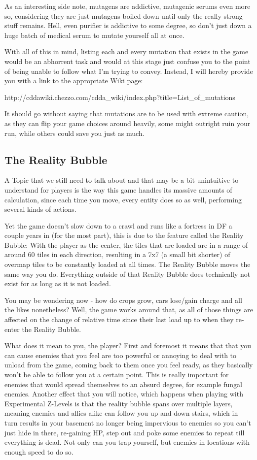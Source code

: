 As an interesting side note, mutagens are addictive, mutagenic serums even more so, considering they are just mutagens boiled down until only the really strong stuff remains. Hell, even purifier is addictive to some degree, so don't just down a huge batch of medical serum to mutate yourself all at once.

With all of this in mind, listing each and every mutation that exists in the game would be an abhorrent task and would at this stage just confuse you to the point of being unable to follow what I'm trying to convey. Instead, I will hereby provide you with a link to the appropriate Wiki page:

http://cddawiki.chezzo.com/cdda\_wiki/index.php?title=List\_of\_mutations

It should go without saying that mutations are to be used with extreme caution, as they can flip your game choices around heavily, some might outright ruin your run, while others could save you just as much.

\subsection{The Reality Bubble}

A Topic that we still need to talk about and that may be a bit unintuitive to understand for players is the way this game handles its massive amounts of calculation, since each time you move, every entity does so as well, performing several kinds of actions.

Yet the game doesn't slow down to a crawl and runs like a fortress in DF a couple years in (for the most part), this is due to the feature called the Reality Bubble: With the player as the center, the tiles that are loaded are in a range of around 60 tiles in each direction, resulting in a 7x7 (a small bit shorter) of overmap tiles to be constantly loaded at all times. The Reality Bubble moves the same way you do. Everything outside of that Reality Bubble does technically not exist for as long as it is not loaded.

You may be wondering now - how do crops grow, cars lose/gain charge and all the likes nonetheless? Well, the game works around that, as all of those things are affected on the change of relative time since their last load up to when they re-enter the Reality Bubble.

What does it mean to you, the player? First and foremost it means that that you can cause enemies that you feel are too powerful or annoying to deal with to unload from the game, coming back to them once you feel ready, as they basically won't be able to follow you at a certain point. This is really important for enemies that would spread themselves to an absurd degree, for example fungal enemies. Another effect that you will notice, which happens when playing with Experimental Z-Levels is that the reality bubble spans over multiple layers, meaning enemies and allies alike can follow you up and down stairs, which in turn results in your basement no longer being impervious to enemies so you can't just hide in there, re-gaining HP, step out and poke some enemies to repeat till everything is dead. Not only can you trap yourself, but enemies in locations with enough speed to do so.

